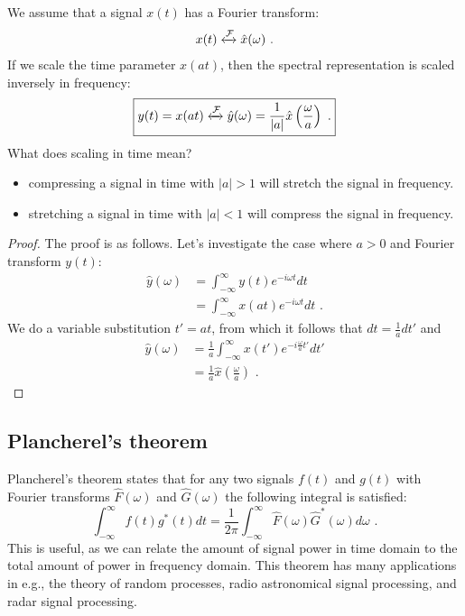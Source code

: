 We assume that a signal $x(t)$ has a Fourier transform:
\begin{align}
x(t) \xleftrightarrow{\mathcal{F}} \hat{x}(\omega)\,\,.
\end{align}
If we scale the time parameter $x(at)$, then the spectral representation is scaled inversely in frequency:
\begin{align}
\boxed{
  y(t) = x(at) \xleftrightarrow{\mathcal{F}} \hat{y}(\omega) = \frac{1}{|a|}\hat{x}\left(\frac{\omega}{a}\right)\,\,.
  \label{eq:timescale_ft_pair}
}
\end{align}
What does scaling in time mean?
\begin{itemize}
\item compressing a signal in time with $|a|>1$ will stretch the signal in frequency.
\item stretching a signal in time with $|a|<1$ will compress the signal in frequency. 
\end{itemize}
\begin{proof}
The proof is as follows. Let's investigate the case where $a > 0$ and Fourier transform $y(t)$:
\begin{align}
\hat{y}(\omega) &= \int_{-\infty}^{\infty} y(t) e^{-i\omega t}dt\\
                &= \int_{-\infty}^{\infty} x(at) e^{-i\omega t}dt\,\,.
\end{align}
We do a variable substitution $t'=at$, from which it follows that $dt=\frac{1}{a}dt'$ and 
\begin{align}
\hat{y}(\omega) &= \frac{1}{a}\int_{-\infty}^{\infty} x(t') e^{-i\frac{\omega}{a} t' }dt'\\
 &= \frac{1}{a}\hat{x}\left(\frac{\omega}{a} \right)\,\,.
\end{align}
\end{proof}







\subsection{Plancherel's theorem}

Plancherel's theorem states that for any two signals $f(t)$ and $g(t)$ with Fourier transforms $\hat{F}(\omega)$ and $\hat{G}(\omega)$ the following integral is satisfied:
\begin{equation}
\boxed{
\int_{-\infty}^{\infty} f(t) g^*(t) dt = \frac{1}{2\pi} \int_{-\infty}^{\infty}  \hat{F}(\omega)\hat{G}^*(\omega) d\omega\,\,.
}
\end{equation}
This is useful, as we can relate the amount of signal power in time domain to the total amount of power in frequency domain. This theorem has many applications in e.g., the theory of random processes, radio astronomical signal processing, and radar signal processing.


